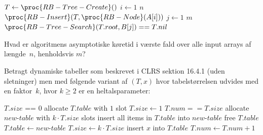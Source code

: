 \begin{codebox}
  \li $T \gets \proc{RB-Tree-Create}()$
  \li \For $i \gets 1$ \To $n$ \Do
  \li $\proc{RB-Insert}(T, \proc{RB-Node}(A[i]))$ \End
  \li \For $j \gets 1$ \To $m$ \Do
  \li {} $\proc{RB-Tree-Search}(T.root, B[j]) == T.nil$ \Do
  \li \Return {}\End\End
  \li \Return {}
\end{codebox}
Hvad er algoritmens asymptotiske køretid i værste fald over alle input arrays af længde~$n$, henholdsvis $m$?
\etsvar
\mulighederstart
{}
\korrekt
{}
\mulighederslut
{}



Betragt dynamiske tabeller som beskrevet i CLRS sektion 16.4.1 (uden sletninger) men med følgende variant af $(T,x)$ hvor tabelstørrelsen udvides med en faktor~$k$, hvor $k\geq 2$ er en heltalsparameter:

\begin{codebox}
  \li \If $T.size$ == $0$ \Do
  \li allocate $T.table$ with $1$ slot
  \li $T.size \gets 1$ \End
  \li \If $T.num == T.size$ \Do
  \li allocate $\mathit{new\text{-}table}$ with $k \cdot T.size$ slots
  \li insert all items in $T.table$ into $\mathit{new\text{-}table}$
  \li free $T.table$
  \li $T.table \gets \mathit{new\text{-}table}$
  \li $T.size \gets k \cdot T.size$ \End
  \li insert $x$ into $T.table$
  \li $T.num \gets T.num + 1$
\end{codebox}

